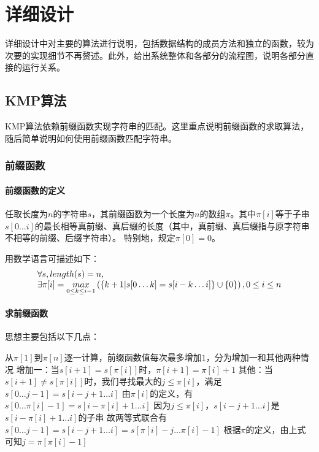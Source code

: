 \documentclass[scheme = chinese]{ctexart}
\begin{document}
\section{详细设计}
详细设计中对主要的算法进行说明，包括数据结构的成员方法和独立的函数，较为次要的实现细节不再赘述。此外，给出系统整体和各部分的流程图，说明各部分直接的运行关系。

\subsection{KMP算法}
KMP算法依赖前缀函数实现字符串的匹配。这里重点说明前缀函数的求取算法，随后简单说明如何使用前缀函数匹配字符串。

\subsubsection{前缀函数}

\paragraph{前缀函数的定义} 任取长度为$n$的字符串$s$，其前缀函数为一个长度为$n$的数组$\pi$。其中$\pi[i]$等于子串$s[0\dots i]$的最长相等真前缀、真后缀的长度（其中，真前缀、真后缀指与原字符串不相等的前缀、后缀字符串）。
特别地，规定$\pi[0] = 0$。

用数学语言可描述如下：
$$
\begin{array}l
    \forall s, length(s) = n, \\
    \exists \pi[i] = \mathop{max}\limits_{0\leq k \leq i-1}\left( \left\{k+1| s[0\dots k] = s[i-k\dots i] \right\} \cup \left\{0\right\} \right), 0 \leq i \leq n \\
\end{array}
$$

\paragraph{求前缀函数} 思想主要包括以下几点：
\begin{outline}
    \1 从$\pi[1]$到$\pi[n]$逐一计算，前缀函数值每次最多增加$1$，分为增加一和其他两种情况
    \1 增加一：当$s[i+1]=s[\pi[i]]$时，$\pi[i+1] = \pi[i]+1$
    \1 其他：当$s[i+1]\ne s[\pi[i]]$时，我们寻找最大的$j\leq \pi[i]$，满足$s[0\dots j-1] = s[i-j+1\dots i]$
        \2 由$\pi[i]$的定义，有$s[0\dots \pi[i]-1] = s[i-\pi[i]+1\dots i]$
        \2 因为$j\leq \pi[i]$，$s[i-j+1\dots i]$是$s[i-\pi[i]+1\dots i]$的子串
        \2 故两等式联合有$s[0\dots j-1] = s[i-j+1\dots i] = s[\pi[i]-j\dots \pi[i]-1]$
        \2 根据$\pi$的定义，由上式可知$j=\pi[\pi[i]-1]$
\end{outline}
\end{document}
